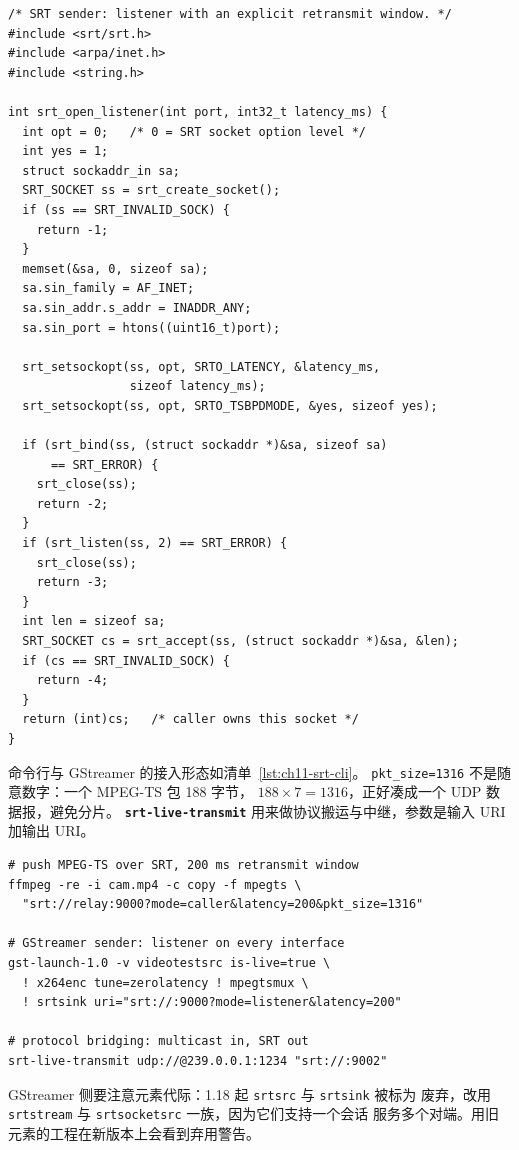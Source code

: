 \documentclass[12pt,a4paper,fontset=fandol]{ctexbook}
\newcommand{\Tp}[1]{\texttt{#1}}
\newcommand{\Lib}[1]{\textbf{\texttt{#1}}}
\begin{document}
\begin{lstlisting}[style=cstyle,caption={SRT 发送端：建立监听会话并设置重传窗口},label={lst:ch11-srt-sender}]
/* SRT sender: listener with an explicit retransmit window. */
#include <srt/srt.h>
#include <arpa/inet.h>
#include <string.h>

int srt_open_listener(int port, int32_t latency_ms) {
  int opt = 0;   /* 0 = SRT socket option level */
  int yes = 1;
  struct sockaddr_in sa;
  SRT_SOCKET ss = srt_create_socket();
  if (ss == SRT_INVALID_SOCK) {
    return -1;
  }
  memset(&sa, 0, sizeof sa);
  sa.sin_family = AF_INET;
  sa.sin_addr.s_addr = INADDR_ANY;
  sa.sin_port = htons((uint16_t)port);

  srt_setsockopt(ss, opt, SRTO_LATENCY, &latency_ms,
                 sizeof latency_ms);
  srt_setsockopt(ss, opt, SRTO_TSBPDMODE, &yes, sizeof yes);

  if (srt_bind(ss, (struct sockaddr *)&sa, sizeof sa)
      == SRT_ERROR) {
    srt_close(ss);
    return -2;
  }
  if (srt_listen(ss, 2) == SRT_ERROR) {
    srt_close(ss);
    return -3;
  }
  int len = sizeof sa;
  SRT_SOCKET cs = srt_accept(ss, (struct sockaddr *)&sa, &len);
  if (cs == SRT_INVALID_SOCK) {
    return -4;
  }
  return (int)cs;   /* caller owns this socket */
}
\end{lstlisting}

命令行与 GStreamer 的接入形态如清单~\ref{lst:ch11-srt-cli}。
\Tp{pkt\_size=1316} 不是随意数字：一个 MPEG-TS 包 188 字节，
$188\times 7=1316$，正好凑成一个 UDP 数据报，避免分片。
\Lib{srt-live-transmit} 用来做协议搬运与中继，参数是输入 URI 加输出 URI。

\begin{lstlisting}[style=shellstyle,caption={SRT 链路的推流、取流与中继},label={lst:ch11-srt-cli}]
# push MPEG-TS over SRT, 200 ms retransmit window
ffmpeg -re -i cam.mp4 -c copy -f mpegts \
  "srt://relay:9000?mode=caller&latency=200&pkt_size=1316"

# GStreamer sender: listener on every interface
gst-launch-1.0 -v videotestsrc is-live=true \
  ! x264enc tune=zerolatency ! mpegtsmux \
  ! srtsink uri="srt://:9000?mode=listener&latency=200"

# protocol bridging: multicast in, SRT out
srt-live-transmit udp://@239.0.0.1:1234 "srt://:9002"
\end{lstlisting}

GStreamer 侧要注意元素代际：1.18 起 \Tp{srtsrc} 与 \Tp{srtsink} 被标为
废弃，改用 \Tp{srtstream} 与 \Tp{srtsocketsrc} 一族，因为它们支持一个会话
服务多个对端。用旧元素的工程在新版本上会看到弃用警告。
\end{document}
